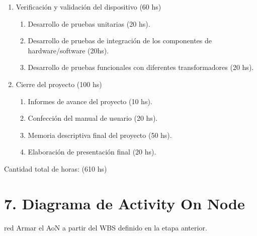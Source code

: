 \documentclass[11pt]{charter}
\begin{document}
\begin{enumerate}
\item Verificación y validación del dispositivo (60 hs)
	\begin{enumerate}
	\item Desarrollo de pruebas unitarias (20 hs).
	\item Desarrollo de pruebas de integración de los componentes de hardware/software (20hs).
	\item Desarrollo de pruebas funcionales con diferentes transformadores (20 hs).
	\end{enumerate}
\item Cierre del proyecto (100 hs)
	\begin{enumerate}
	\item  Informes de avance del proyecto (10 hs).
	\item  Confección del manual de usuario (20 hs).
	\item  Memoria descriptiva final del proyecto (50 hs).
	\item  Elaboración de presentación final (20 hs).
	\end{enumerate}		
\end{enumerate}

Cantidad total de horas: (610 hs)



\section{7. Diagrama de Activity On Node}
\label{sec:AoN}

\begin{consigna}{red}
Armar el AoN a partir del WBS definido en la etapa anterior. 



\end{consigna}
\end{document}
